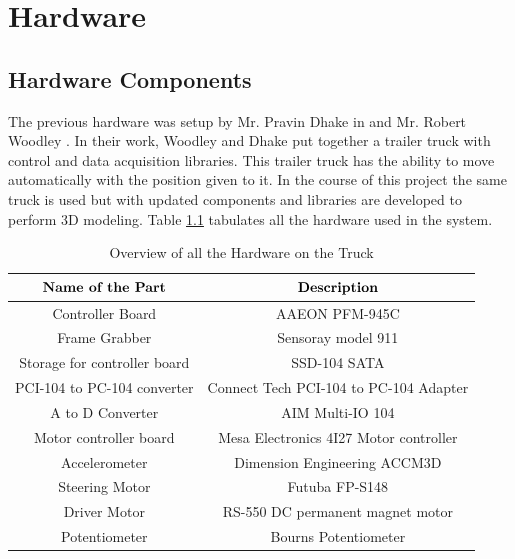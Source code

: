 


\chapter{Hardware}
\label{chap:Hardware}

\section{Hardware Components}
\label{sec:intro}
The previous hardware was setup by Mr. Pravin Dhake in  \cite{dhake2007real}  and Mr. Robert Woodley \cite{woodley1999testbed}. In their work, Woodley and Dhake put together a trailer truck with control and data acquisition libraries. This trailer truck has the ability to move automatically with the position given to it. In the course of this project the same truck is used but with updated components and libraries are developed to perform 3D modeling. Table \ref{table:Hardware} tabulates all the hardware used in the system.


\begin{table}[ht]
 \centering
  \caption{Overview of all the Hardware on the Truck }
 \begin{tabular}{||c|c||}
 \hline \hline
  $\vspace{0.02in} \textbf{Name of the Part}$ & $\vspace{0.02in} \textbf{Description}$ \\
 \hline \hline
  Controller Board  & AAEON PFM-945C \\
 \hline
 Frame Grabber  & Sensoray model 911 \\
 \hline
Storage for controller board    & SSD-104 SATA \\
\hline
PCI-104 to PC-104 converter     & Connect Tech PCI-104 to PC-104 Adapter \\ 
\hline
A to D Converter    & AIM Multi-IO 104 \\
\hline
Motor controller board & Mesa Electronics 4I27 Motor controller \\ 
\hline
Accelerometer   & Dimension Engineering ACCM3D \\
\hline
Steering Motor  & Futuba FP-S148  \\
\hline
Driver Motor    & RS-550 DC permanent magnet motor  \\
\hline
Potentiometer   & Bourns Potentiometer  \\
\hline\hline
 \end{tabular}

    \label{table:Hardware}
\end{table}






